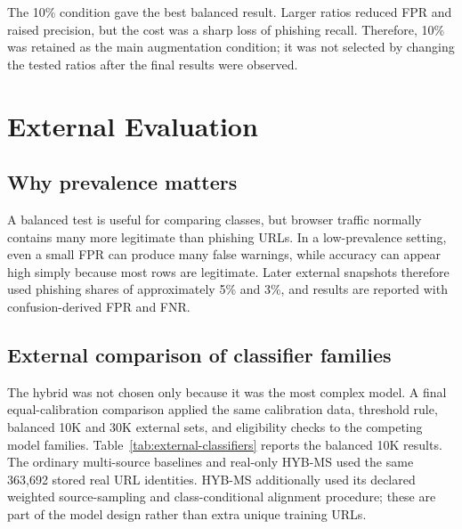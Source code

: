 The 10\% condition gave the best balanced result. Larger ratios reduced FPR and
raised precision, but the cost was a sharp loss of phishing recall. Therefore,
10\% was retained as the main augmentation condition; it was not selected by
changing the tested ratios after the final results were observed.

\section{External Evaluation}

\subsection{Why prevalence matters}

A balanced test is useful for comparing classes, but browser traffic normally
contains many more legitimate than phishing URLs. In a low-prevalence setting,
even a small FPR can produce many false warnings, while accuracy can appear
high simply because most rows are legitimate. Later external snapshots
therefore used phishing shares of approximately 5\% and 3\%, and results are
reported with confusion-derived FPR and FNR.

\subsection{External comparison of classifier families}

The hybrid was not chosen only because it was the most complex model. A final
equal-calibration comparison applied the same calibration data, threshold rule,
balanced 10K and 30K external sets, and eligibility checks to the competing
model families. Table~\ref{tab:external-classifiers} reports the balanced 10K
results. The ordinary multi-source baselines and real-only HYB-MS used the same
363,692 stored real URL identities. HYB-MS additionally used its declared
weighted source-sampling and class-conditional alignment procedure; these are
part of the model design rather than extra unique training URLs.

